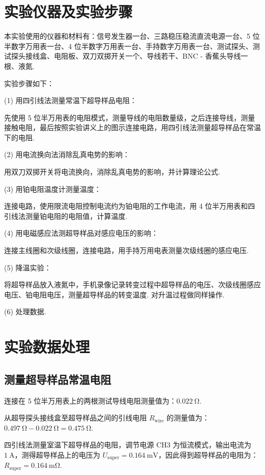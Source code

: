 \documentclass{THUexprep}
\begin{document}
\section{实验仪器及实验步骤}

本实验使用的仪器和材料有：信号发生器一台、三路稳压稳流直流电源一台、5 位半数字万用表一台、4 位半数字万用表一台、手持数字万用表一台、测试探头、测试探头接线盒、电阻板、双刀双掷开关一个、导线若干、BNC - 香蕉头导线一根、液氮.

实验步骤如下：

(1) 用四引线法测量常温下超导样品电阻：

先使用 5 位半万用表的电阻模式，测量导线的电阻数量级，之后连接导线，测量接触电阻，最后按照实验讲义上的图示连接电路，用四引线法测量超导样品在常温下的电阻.

(2) 用电流换向法消除乱真电势的影响：

用双刀双掷开关将电流换向，消除乱真电势的影响，并计算理论公式.

(3) 用铂电阻温度计测量温度：

连接电路，使用限流电阻控制电流约为铂电阻的工作电流，用 4 位半万用表和四引线法测量铂电阻的电阻值，计算温度.

(4) 用电磁感应法测超导样品对感应电压的影响：

连接主线圈和次级线圈，连接电路，用手持万用电表测量次级线圈的感应电压.

(5) 降温实验：

将超导样品放入液氮中，手机录像记录转变过程中超导样品的电压、次级线圈感应电压、铂电阻电压，测量超导样品的转变温度. 对升温过程做同样操作.

(6) 处理数据.

\section{实验数据处理}

\subsection{测量超导样品常温电阻}

连接在 5 位半万用表上的两根测试导线电阻测量值为：$\SI{0.022}{\ohm}$.

从超导探头接线盒至超导样品之间的引线电阻 $R_\text{wire}$ 的测量值为：$\SI{0.497}{\ohm}-\SI{0.022}{\ohm}=\SI{0.475}{\ohm}$.

四引线法测量室温下超导样品的电阻，调节电源 CH3 为恒流模式，输出电流为 $\SI{1}{\ampere}$，测得超导样品上的电压为 $U_\text{super}=\SI{0.164}{\milli\volt}$，因此得到超导样品的电阻为：$R_\text{super}=\SI{0.164}{\milli\ohm}$.
\end{document}
